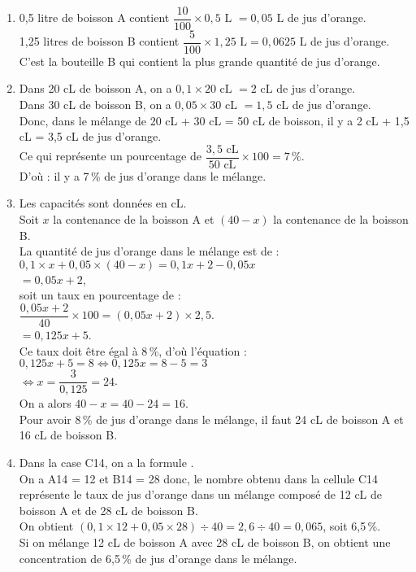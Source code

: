 \ \\ [-5mm]
\begin{enumerate}
   \item 0,5 litre de boisson A contient $\dfrac{10}{100}\times0,5 \text{ L } =0,05 \text{ L}$ de jus d'orange. \\ [1mm]
      1,25 litres de boisson B contient $\dfrac{5}{100}\times1,25 \text{ L} = 0,0625 \text{ L}$ de jus d'orange. \\ [1mm]
      {\blue C'est la bouteille B qui contient la plus grande quantité de jus d'orange.}
   \item Dans 20 cL de boisson A, on a $0,1\times20 \text{ cL } =2 \text{ cL}$ de jus d'orange. \\
      Dans 30 cL de boisson B, on a $0,05\times30 \text{ cL } =1,5 \text{ cL}$ de jus d'orange. \\
      Donc, dans le mélange de 20 cL + 30 cL = 50 cL de boisson, il y a 2 cL + 1,5 cL = 3,5 cL de jus d'orange. \\ [1mm]
      Ce qui représente un pourcentage de $\dfrac{3,5\text{ cL}}{50\text{ cL}}\times100 =7\,\%$. \\ [1mm]
      D'où : {\blue il y a 7\,\% de jus d'orange dans le mélange.}
   \item Les capacités sont données en cL. \\
      Soit $x$ la contenance de la boisson A et $(40-x)$ la contenance de la boisson B. \\
      La quantité de jus d'orange dans le mélange est de : \\
      $0,1\times x+0,05\times(40-x) =0,1x+2-0,05x$ \\
      \hspace*{3.6cm} $=0,05x+2$, \\ [1mm]
      soit un taux en pourcentage de : \\ [1mm]
      $\dfrac{0,05x+2}{40}\times100 =(0,05x+2)\times2,5$. \\ [1mm]
      \hspace*{2.35cm} $=0,125x+5$. \\
      Ce taux doit être égal à 8\,\%, d'où l'équation : \\
      $0,125x+5 =8 \iff 0,125x= 8-5 =3$ \\ [1mm]
      \hspace*{2.2cm} $\iff x =\dfrac{3}{0,125} =24$. \\ [1mm]
      On a alors $40-x =40-24 =16$. \\
      {\blue Pour avoir 8\,\% de jus d'orange dans le mélange, il faut 24 cL de boisson A et 16 cL de boisson B.}
   \item Dans la case C14, on a la formule . \\
      On a A14 = 12 et B14 = 28 donc, le nombre obtenu dans la cellule C14 représente le taux de jus d'orange dans un mélange composé de 12 cL de boisson A et de 28 cL de boisson B. \\
      On obtient $(0,1\times12+0,05\times28)\div40 =2,6\div40 = 0,065$, soit 6,5\,\%. \\
      {\blue Si on mélange 12 cL de boisson A avec 28 cL de boisson B, on obtient une concentration de 6,5\,\% de jus d'orange dans le mélange.}
\end{enumerate}
